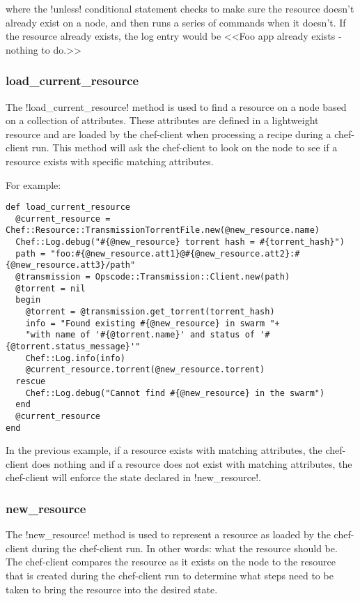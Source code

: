 where the \inline!unless! conditional statement checks to make sure the resource doesn't already exist on a node, and then runs a series of commands when it doesn't. If the resource already exists, the log entry would be <<Foo app already exists - nothing to do.>>

\subsubsection{load\_current\_resource}

The \inline!load_current_resource! method is used to find a resource on a node based on a collection of attributes. These attributes are defined in a lightweight resource and are loaded by the chef-client when processing a recipe during a chef-client run. This method will ask the chef-client to look on the node to see if a resource exists with specific matching attributes.

For example:

\begin{lstlisting}[label=lst:cookbook-lwrp-dsl-load-current-resource]
def load_current_resource
  @current_resource = Chef::Resource::TransmissionTorrentFile.new(@new_resource.name)
  Chef::Log.debug("#{@new_resource} torrent hash = #{torrent_hash}")
  path = "foo:#{@new_resource.att1}@#{@new_resource.att2}:#{@new_resource.att3}/path"
  @transmission = Opscode::Transmission::Client.new(path)
  @torrent = nil
  begin
    @torrent = @transmission.get_torrent(torrent_hash)
    info = "Found existing #{@new_resource} in swarm "+
    "with name of '#{@torrent.name}' and status of '#{@torrent.status_message}'"
    Chef::Log.info(info)
    @current_resource.torrent(@new_resource.torrent)
  rescue
    Chef::Log.debug("Cannot find #{@new_resource} in the swarm")
  end
  @current_resource
end
\end{lstlisting}

In the previous example, if a resource exists with matching attributes, the chef-client does nothing and if a resource does not exist with matching attributes, the chef-client will enforce the state declared in \inline!new_resource!.

\subsubsection{new\_resource}

The \inline!new_resource! method is used to represent a resource as loaded by the chef-client during the chef-client run. In other words: what the resource should be. The chef-client compares the resource as it exists on the node to the resource that is created during the chef-client run to determine what steps need to be taken to bring the resource into the desired state.

